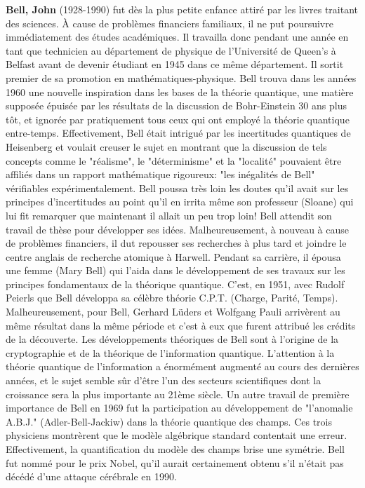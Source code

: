 \textbf{Bell, John} (1928-1990) fut dès la plus petite enfance attiré par les livres traitant des sciences. À cause de problèmes financiers familiaux, il ne put poursuivre immédiatement des études académiques. Il travailla donc pendant une année en tant que technicien au département de physique de l'Université de Queen's à Belfast avant de devenir étudiant en 1945 dans ce même département. Il sortit premier de sa promotion en mathématiques-physique. Bell trouva dans les années 1960 une nouvelle inspiration dans les bases de la théorie quantique, une matière supposée épuisée par les résultats de la discussion de Bohr-Einstein 30 ans plus tôt, et ignorée par pratiquement tous ceux qui ont employé la théorie quantique entre-temps. Effectivement, Bell était intrigué par les incertitudes quantiques de Heisenberg et voulait creuser le sujet en montrant que la discussion de tels concepts comme le "réalisme", le "déterminisme" et la "localité" pouvaient être affiliés dans un rapport mathématique rigoureux: "les inégalités de Bell" vérifiables expérimentalement. Bell poussa très loin les doutes qu'il avait sur les principes d'incertitudes au point qu'il en irrita même son professeur (Sloane) qui lui fit remarquer que maintenant il allait un peu trop loin! Bell attendit son travail de thèse pour développer ses idées. Malheureusement, à nouveau à cause de problèmes financiers, il dut repousser ses recherches à plus tard et joindre le centre anglais de recherche atomique à Harwell. Pendant sa carrière, il épousa une femme (Mary Bell) qui l'aida dans le développement de ses travaux sur les principes fondamentaux de la théorique quantique. C'est, en 1951, avec Rudolf Peierls que Bell développa sa célèbre théorie C.P.T. (Charge, Parité, Temps). Malheureusement, pour Bell, Gerhard Lüders et Wolfgang Pauli arrivèrent au même résultat dans la même période et c'est à eux que furent attribué les crédits de la découverte. Les développements théoriques de Bell sont à l'origine de la cryptographie et de la théorique de l'information quantique. L'attention à la théorie quantique de l'information a énormément augmenté au cours des dernières années, et le sujet semble sûr d'être l'un des secteurs scientifiques dont la croissance sera la plus importante au 21ème siècle. Un autre travail de première importance de Bell en 1969 fut la participation au développement de "l'anomalie A.B.J." (Adler-Bell-Jackiw) dans la théorie quantique des champs. Ces trois physiciens montrèrent que le modèle algébrique standard contentait une erreur. Effectivement, la quantification du modèle des champs brise une symétrie. Bell fut nommé pour le prix Nobel, qu'il aurait certainement obtenu s'il n'était pas décédé d'une attaque cérébrale en 1990.

